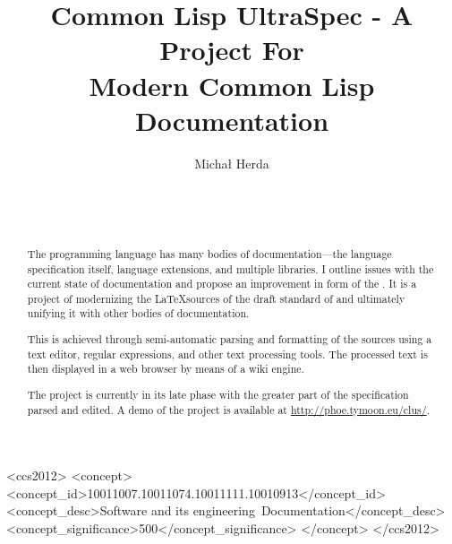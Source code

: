 \documentclass{sig-alternate-05-2015}
\def\inputtex#1{}
\begin{document}
\title{Common Lisp UltraSpec - A Project For \\ Modern Common Lisp Documentation}
\author{\alignauthor
Michał Herda\\
\\
\\
\\
}


\maketitle

\begin{abstract}
The \cl{} programming language has many bodies of documentation---the language specification \cite{ANSI:1994:standard} itself, language extensions, and multiple libraries. I outline issues with the current state of \cl{} documentation and propose an improvement in form of the \cl{} \us{}. It is a project of modernizing the \LaTeX sources of the draft standard \cite{ANSI:1994:draft} of \cl{} and ultimately unifying it with other bodies of \cl{} documentation.

This is achieved through semi-automatic parsing and formatting of the sources using a text editor, regular expressions, and other text processing tools. The processed text is then displayed in a web browser by means of a wiki engine.

The project is currently in its late phase with the greater part of the specification parsed and edited. A demo of the project is available at \url{http://phoe.tymoon.eu/clus/}.
\end{abstract}

\begin{CCSXML}
<ccs2012>
<concept>
<concept_id>10011007.10011074.10011111.10010913</concept_id>
<concept_desc>Software and its engineering~Documentation</concept_desc>
<concept_significance>500</concept_significance>
</concept>
</ccs2012>
\end{CCSXML}


\printccsdesc


\inputtex{sec-introduction.tex}
\inputtex{sec-previous-work.tex}
\inputtex{sec-my-work.tex}
\inputtex{sec-conclusions-and-future-work.tex}



\end{document}
